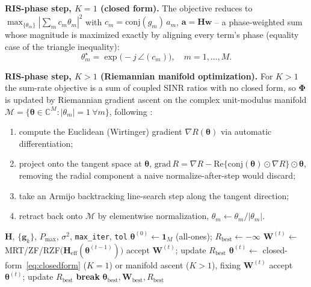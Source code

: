 \documentclass[conference]{IEEEtran}
\begin{document}
\textbf{RIS-phase step, $K{=}1$ (closed form).} The objective reduces to
$\max_{\{\theta_m\}} |\sum_m c_m \theta_m|^2$ with
$c_m=\mathrm{conj}(g_m)\,a_m$, $\mathbf{a}=\mathbf{H}\mathbf{w}$ -- a
phase-weighted sum whose magnitude is maximized exactly by aligning
every term's phase (equality case of the triangle inequality):
\begin{equation}
\theta_m^\star = \exp\!\big(-j\,\angle(c_m)\big), \quad m=1,\dots,M.
\label{eq:closedform}
\end{equation}

\textbf{RIS-phase step, $K{>}1$ (Riemannian manifold optimization).} For
$K{>}1$ the sum-rate objective is a sum of coupled SINR ratios with no
closed form, so $\mathbf{\Phi}$ is updated by Riemannian gradient ascent
on the complex unit-modulus manifold
$\mathcal{M}=\{\boldsymbol{\theta}\in\mathbb{C}^M:|\theta_m|{=}1\ \forall m\}$,
following \cite{yu2019miso,boumal2014manopt}:
\begin{enumerate}
\item compute the Euclidean (Wirtinger) gradient $\nabla R(\boldsymbol{\theta})$
  via automatic differentiation;
\item project onto the tangent space at $\boldsymbol{\theta}$,
  $\mathrm{grad}\,R = \nabla R - \mathrm{Re}\{\mathrm{conj}(\boldsymbol{\theta})\odot\nabla R\}\odot\boldsymbol{\theta}$,
  removing the radial component a naive normalize-after-step would
  discard;
\item take an Armijo backtracking line-search step along the tangent
  direction;
\item retract back onto $\mathcal{M}$ by elementwise normalization,
  $\theta_m \leftarrow \theta_m/|\theta_m|$.
\end{enumerate}

\begin{algorithm}[t]
\caption{Alternating Optimization (AO)}
\label{alg:ao}
\begin{algorithmic}[1]
\Require $\mathbf{H}$, $\{\mathbf{g}_k\}$, $P_{\max}$, $\sigma^2$, \texttt{max\_iter}, \texttt{tol}
\State $\boldsymbol{\theta}^{(0)} \leftarrow \mathbf{1}_M$ (all-ones); $R_{\text{best}} \leftarrow -\infty$
  \State $\mathbf{W}^{(t)} \leftarrow$ MRT/ZF/RZF$\big(\mathbf{H}_{\mathrm{eff}}(\boldsymbol{\theta}^{(t-1)})\big)$
     \State accept $\mathbf{W}^{(t)}$; update $R_{\text{best}}$
  \EndIf
  \State $\boldsymbol{\theta}^{(t)} \leftarrow$ closed-form~\eqref{eq:closedform} ($K{=}1$) or manifold ascent ($K{>}1$), fixing $\mathbf{W}^{(t)}$
     \State accept $\boldsymbol{\theta}^{(t)}$; update $R_{\text{best}}$
  \EndIf
   \textbf{break} \EndIf
\EndFor
\State \Return $\boldsymbol{\theta}_{\text{best}}, \mathbf{W}_{\text{best}}, R_{\text{best}}$
\end{algorithmic}
\end{algorithm}
\end{document}
